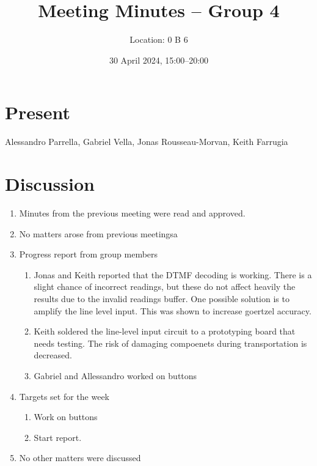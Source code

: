 \documentclass{cce2014-meetings}
\title{Meeting Minutes -- Group 4}
\author{Location: 0 B 6}
\date{30 April 2024, 15:00--20:00}
\begin{document}
\maketitle

\section*{Present}
Alessandro Parrella,
Gabriel Vella,
Jonas Rousseau-Morvan,
Keith Farrugia

\section*{Discussion}

\begin{enumerate}


      \item Minutes from the previous meeting were read and approved.

      \item No matters arose from previous meetingsa

      \item Progress report from group members
            \begin{enumerate}
                  \item Jonas and Keith reported that the DTMF decoding is working.
                  There is a slight chance of incorrect readings, but these do not 
                  affect heavily the results due to the invalid readings buffer. 
                  One possible solution is to amplify the line level input. This 
                  was shown to increase goertzel accuracy.
                  \item Keith soldered the line-level input circuit to a 
                  prototyping board that needs testing. The risk of damaging 
                  compoenets during transportation is decreased.
                  \item Gabriel and Allessandro worked on buttons
            \end{enumerate}

      \item Targets set for the week
            \begin{enumerate}
                  \item Work on buttons 
                  \item Start report.  
            \end{enumerate}
            
      \item No other matters were discussed
\end{enumerate}
\end{document}

